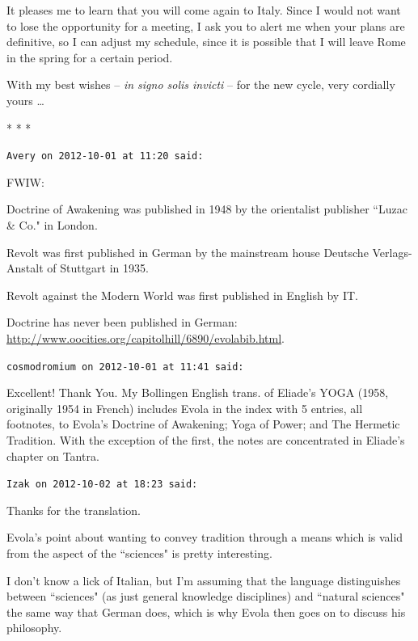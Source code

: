 It pleases me to learn that you will come again to Italy. Since I would not want to lose the opportunity for a meeting, I ask you to alert me when your plans are definitive, so I can adjust my schedule, since it is possible that I will leave Rome in the spring for a certain period.

With my best wishes – \emph{in signo solis invicti} – for the new cycle, very cordially yours …




\begin{center}* * *\end{center}

\begin{footnotesize}\begin{sffamily}



\texttt{Avery on 2012-10-01 at 11:20 said: }

FWIW:

Doctrine of Awakening was published in 1948 by the orientalist publisher ``Luzac \& Co." in London.

Revolt was first published in German by the mainstream house Deutsche Verlags-Anstalt of Stuttgart in 1935.

Revolt against the Modern World was first published in English by IT.

Doctrine has never been published in German: \url{http://www.oocities.org/capitolhill/6890/evolabib.html}.


\hfill

\texttt{cosmodromium on 2012-10-01 at 11:41 said: }

Excellent! Thank You. My Bollingen English trans. of Eliade's YOGA (1958, originally 1954 in French) includes Evola in the index with 5 entries, all footnotes, to Evola's Doctrine of Awakening; Yoga of Power; and The Hermetic Tradition. With the exception of the first, the notes are concentrated in Eliade's chapter on Tantra.


\hfill

\texttt{Izak on 2012-10-02 at 18:23 said: }

Thanks for the translation.

Evola's point about wanting to convey tradition through a means which is valid from the aspect of the ``sciences" is pretty interesting.

I don't know a lick of Italian, but I'm assuming that the language distinguishes between ``sciences" (as just general knowledge disciplines) and ``natural sciences" the same way that German does, which is why Evola then goes on to discuss his philosophy.


\end{sffamily}
\end{footnotesize}
